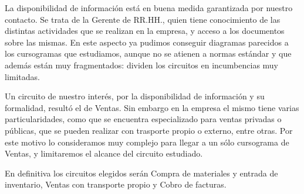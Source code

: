 \documentclass[12pt,titlepage]{article}
\begin{document}
La disponibilidad de informaci\'on est\'a en buena medida garantizada por nuestro contacto. Se trata de la Gerente de RR.HH., quien tiene conocimiento de las distintas actividades que se realizan en la empresa, y acceso a los documentos sobre las mismas. En este aspecto ya pudimos conseguir diagramas parecidos a los cursogramas que estudiamos, aunque no se atienen a normas est\'andar y que adem\'as est\'an muy fragmentados: dividen los circuitos en incumbencias muy limitadas.

Un circuito de nuestro inter\'es, por la disponibilidad de informaci\'on y su formalidad, result\'o el de Ventas. Sin embargo en la empresa el mismo tiene varias particularidades, como que se encuentra especializado para ventas privadas o p\'ublicas, que se pueden realizar con trasporte propio o externo, entre otras. Por este motivo lo consideramos muy complejo para llegar a un s\'olo cursograma de Ventas, y limitaremos el alcance del circuito estudiado.

En definitiva los circuitos elegidos ser\'an Compra de materiales y entrada de inventario, Ventas con transporte propio y Cobro de facturas.
\end{document}

